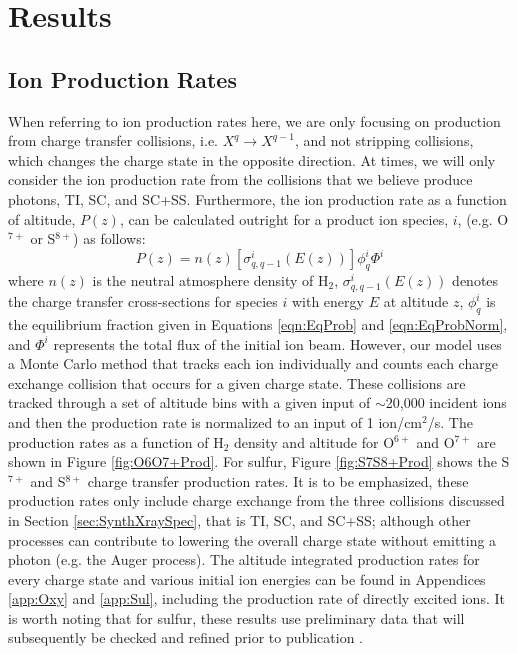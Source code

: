\documentclass[draft]{agujournal2018}
\begin{document}
\section{Results}

\subsection{Ion Production Rates}

When referring to ion production rates here, we are only focusing on production from charge transfer collisions, i.e. $X^q \rightarrow X^{q-1}$, and not stripping collisions, which changes the charge state in the opposite direction.
At times, we will only consider the ion production rate from the collisions that we believe produce photons, TI, SC, and SC+SS.
Furthermore, the ion production rate as a function of altitude, $P(z)$, can be calculated outright for a product ion species, $i$, (e.g. O$^{7+}$ or S$^{8+}$) as follows:
\begin{equation}
    P(z)=n(z)[\sigma_{q,q-1}^i(E(z))]\phi_q^i\Phi^i
\end{equation}
where $n(z)$ is the neutral atmosphere density of H$_2$, $\sigma_{q,q-1}^i(E(z))$ denotes the charge transfer cross-sections for species $i$ with energy $E$ at altitude $z$, $\phi_q^i$ is the equilibrium fraction given in Equations \ref{eqn:EqProb} and \ref{eqn:EqProbNorm}, and $\Phi^i$ represents the total flux of the initial ion beam.
However, our model uses a Monte Carlo method that tracks each ion individually and counts each charge exchange collision that occurs for a given charge state.
These collisions are tracked through a set of altitude bins with a given input of $\sim$20,000 incident ions and then the production rate is normalized to an input of 1 ion/cm$^2$/s.
The production rates as a function of H$_2$ density and altitude for O$^{6+}$ and O$^{7+}$ are shown in Figure \ref{fig:O6O7+Prod}.
For sulfur, Figure \ref{fig:S7S8+Prod} shows the S$^{7+}$ and S$^{8+}$ charge transfer production rates.
It is to be emphasized, these production rates only include charge exchange from the three collisions discussed in Section \ref{sec:SynthXraySpec}, that is TI, SC, and SC+SS; although other processes can contribute to lowering the overall charge state without emitting a photon (e.g. the Auger process).
The altitude integrated production rates for every charge state and various initial ion energies can be found in Appendices \ref{app:Oxy} and \ref{app:Sul}, including the production rate of directly excited ions.
It is worth noting that for sulfur, these results use preliminary data that will subsequently be checked and refined prior to publication \citep{gharibnejad2019}.
\end{document}

